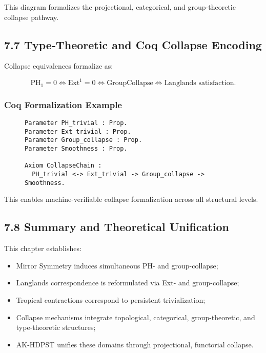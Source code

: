 \documentclass[11pt]{article}
\begin{document}
This diagram formalizes the projectional, categorical, and group-theoretic collapse pathway.

\subsection*{7.7 Type-Theoretic and Coq Collapse Encoding}

Collapse equivalences formalize as:

\[
\mathrm{PH}_1 = 0 \iff \mathrm{Ext}^1 = 0 \iff \text{GroupCollapse} \iff \text{Langlands satisfaction}.
\]

\subsubsection*{Coq Formalization Example}

\begin{figure}[h]
\centering
\begin{lstlisting}[language=Coq, caption=Collapse Typing and Group Collapse Schema]
Parameter PH_trivial : Prop.
Parameter Ext_trivial : Prop.
Parameter Group_collapse : Prop.
Parameter Smoothness : Prop.

Axiom CollapseChain :
  PH_trivial <-> Ext_trivial -> Group_collapse -> Smoothness.
\end{lstlisting}
\end{figure}


This enables machine-verifiable collapse formalization across all structural levels.

\subsection*{7.8 Summary and Theoretical Unification}

This chapter establishes:

\begin{itemize}
    \item Mirror Symmetry induces simultaneous PH- and group-collapse;
    \item Langlands correspondence is reformulated via Ext- and group-collapse;
    \item Tropical contractions correspond to persistent trivialization;
    \item Collapse mechanisms integrate topological, categorical, group-theoretic, and type-theoretic structures;
    \item AK-HDPST unifies these domains through projectional, functorial collapse.
\end{itemize}
\end{document}
